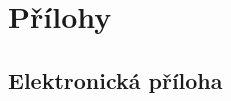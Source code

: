 \documentclass[12pt,a4paper]{report}
\begin{document}



\tableofcontents

% 
% 
% 
% 
% 

% 












\listoffigures

\listoftables


\ifx\ThesisType\TypePhD
{}
\fi

\appendix
\chapter{Přílohy}

\section{Elektronická příloha}
\label{app:electronic}
\end{document}
